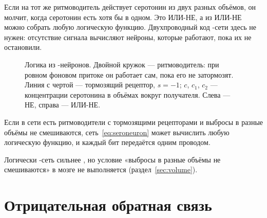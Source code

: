 Если на тот же ритмоводитель действует серотонин из двух разных объёмов, он молчит, когда серотонин есть хотя бы в одном. Это ИЛИ-НЕ, а из ИЛИ-НЕ можно собрать любую логическую функцию. Двухпроводный код -сети здесь не нужен: отсутствие сигнала вычисляют нейроны, которые работают, пока их не остановили.

\begin{figure}[t]
\centering
{}
\caption{Логика из -нейронов. Двойной кружок --- ритмоводитель: при ровном фоновом притоке он работает сам, пока его не затормозят. Линия с чертой --- тормозящий рецептор, $s=-1$; $c$, $c_1$, $c_2$ --- концентрации серотонина в объёмах вокруг получателя. Слева --- НЕ, справа --- ИЛИ-НЕ.}
\label{fig:serogates}
\end{figure}

\begin{keyblock}
\begin{proposition}
\label{prop:serocomplete}
Если в сети есть ритмоводители с тормозящими рецепторами и выбросы в разные объёмы не смешиваются, сеть~\eqref{eq:seroneuron} может вычислить любую логическую функцию, и каждый бит передаётся одним проводом.
\end{proposition}
\end{keyblock}

Логически -сеть сильнее , но условие «выбросы в разные объёмы не смешиваются» в мозге не выполняется (раздел~\ref{sec:volume}).

\section{Отрицательная обратная связь}

